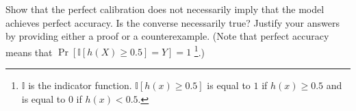 \item {}
Show that
the perfect calibration does not necessarily imply that the model achieves perfect accuracy. Is the
converse necessarily true? Justify your answers by providing either a proof or a counterexample. (Note that perfect accuracy means that $\Pr[\mathbb{I} [h(X) \ge 0.5] = Y] = 1$ \footnote{$\mathbb{I}$ is the indicator function. $\mathbb{I}[h(x) \ge 0.5]$ is equal to $1$ if $h(x) \ge 0.5$ and is equal to $0$ if $h(x) < 0.5$.}.)


